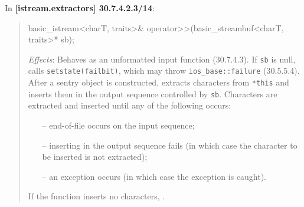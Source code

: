 \documentclass{wg21}
\begin{document}
In \textbf{[istream.extractors] 30.7.4.2.3/14}:
\begin{quote}
\begin{codeblock}
basic_istream<charT, traits>& operator>>(basic_streambuf<charT, traits>* sb);
\end{codeblock}
\textit{Effects}: Behaves as an unformatted input function (30.7.4.3). If \texttt{sb}
is null, calls \texttt{setstate(failbit)}, which may throw \texttt{ios_base::failure}
(30.5.5.4). After a sentry object is constructed, extracts characters from \texttt{*this}
and inserts them in the output sequence controlled by \texttt{sb}. Characters are
extracted and inserted until any of the following occurs:
\begin{itemize}
  \item[--] end-of-file occurs on the input sequence;
  \item[--] inserting in the output sequence fails (in which case the character to
            be inserted is not extracted);
  \item[--] an exception occurs (in which case the exception is caught).
\end{itemize}
If the function inserts no characters, . 
\end{quote}
\end{document}
